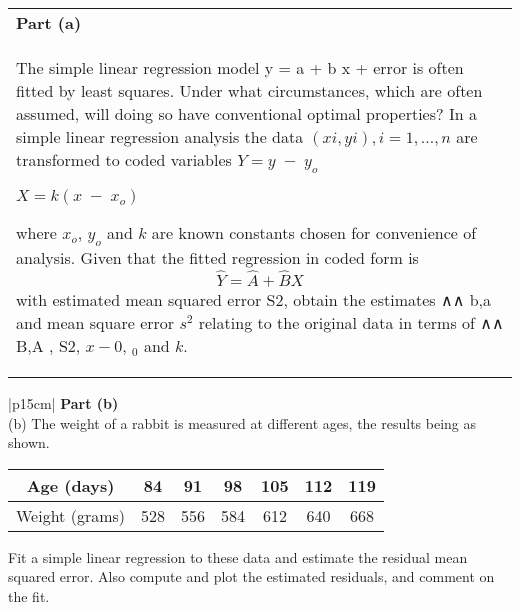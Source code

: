 \documentclass[a4paper,12pt]{article}
\begin{document}
\begin{table}[ht!]
     \centering
     \begin{tabular}{|p{15cm}|}
     \hline       
     \large
 \noindent \textbf{Part (a)}\\
\noindent 
 The simple linear regression model y = a  + b x + error is often fitted by least squares.  Under what circumstances, which are often assumed, will doing so have conventional optimal properties?
In a simple linear regression analysis the data $( xi, yi), i = 1, \ldots, n$ are transformed to coded variables $Y = y \; -\; y_o$

$X = k(x\; -\; x_o)$

where $x_o$, $y_o$ and $k$ are known constants chosen for convenience of analysis.
Given that the fitted regression in coded form is
$$\hat{Y} = \hat{A} + \hat{B} X$$
with estimated mean squared error S2, obtain the estimates 
∧∧ b,a and mean square
error $s^2$ relating to the original data in terms of 
∧∧ B,A , S2, $x-0$, $_0$ and $k$.
\\ \hline
 \end{tabular}
\end{table}



\begin{table}[ht!]
     \centering
     \begin{tabular}{|p{15cm}|}
     \hline        
 \noindent \textbf{Part (b)}\\
\noindent (b) The weight of a rabbit is measured at different ages, the results being as shown.


\begin{center}
\begin{tabular}{|c|c|c|c|c|c|c|} \hline
Age (days) & 84 & 91 & 98 & 105 & 112 & 119  \\ \hline
Weight (grams) & 528 & 556 & 584 & 612 & 640 & 668  \\ \hline

\end{tabular}
\end{center}


Fit a simple linear regression to these data and estimate the residual mean squared error.  
Also compute and plot the estimated residuals, and comment on the fit.

\\ \hline
 \end{tabular}
\end{table}
\end{document}
